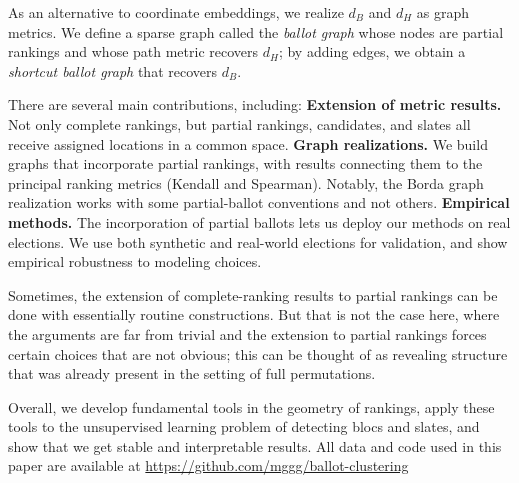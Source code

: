 \documentclass{amsart}
\theoremstyle{plain}
\theoremstyle{definition}
\theoremstyle{remark}
\begin{document}
As an alternative to coordinate embeddings, we realize $d_B$ and $d_H$ as graph metrics.  We define a sparse graph called the {\em ballot graph} whose nodes are partial rankings and whose path metric recovers $d_H$; by adding edges, we obtain a {\em shortcut ballot graph} that recovers $d_B$.  

There are several main contributions, including:
{\bf Extension of metric results.}  Not only complete rankings, but partial rankings, candidates, and slates all receive assigned locations in a common space.
{\bf Graph realizations.}  We build graphs that incorporate partial rankings, with results connecting them to the principal ranking metrics (Kendall and Spearman).  Notably, the Borda graph realization works with some partial-ballot conventions and not others.
{\bf Empirical methods.}  The incorporation of partial ballots lets us deploy our methods on real elections.  We use both synthetic and real-world elections for validation, and show empirical robustness to modeling choices. 


Sometimes, the extension of complete-ranking results to partial rankings can be done with essentially routine constructions.  But that is not the case here, where the arguments are far from trivial and the extension to partial rankings forces certain choices that are not obvious; this can be thought of as revealing structure that was already present in the setting of full permutations.

Overall, we develop fundamental tools in the geometry of rankings, apply these tools to the unsupervised learning problem of detecting blocs and slates, and show that we get stable and interpretable results.  
All data and code used in this paper are available at \url{https://github.com/mggg/ballot-clustering}

\end{document}
